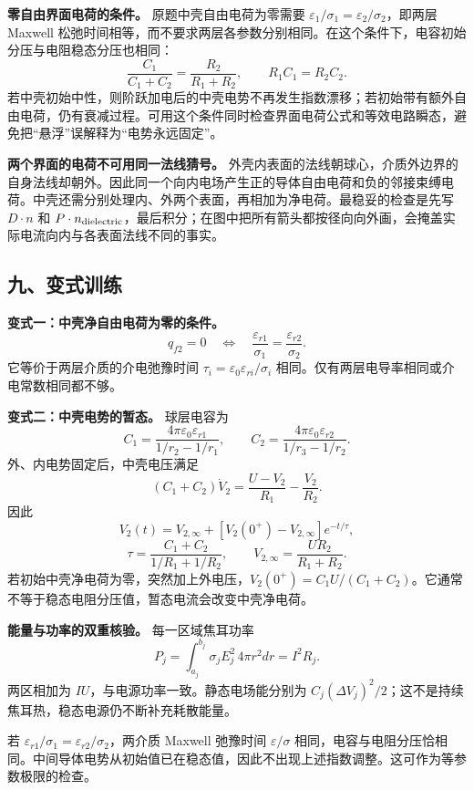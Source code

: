\documentclass[12pt,a4paper,UTF8]{ctexart}
\begin{document}
\textbf{零自由界面电荷的条件。} 原题中壳自由电荷为零需要
\(\varepsilon_1/\sigma_1=\varepsilon_2/\sigma_2\)，即两层 Maxwell
松弛时间相等，而不要求两层各参数分别相同。在这个条件下，电容初始分压与电阻稳态分压也相同：
\[
\frac{C_1}{C_1+C_2}
=\frac{R_2}{R_1+R_2},
\qquad R_1C_1=R_2C_2.
\]
若中壳初始中性，则阶跃加电后的中壳电势不再发生指数漂移；若初始带有额外自由电荷，仍有衰减过程。可用这个条件同时检查界面电荷公式和等效电路瞬态，避免把``悬浮''误解释为``电势永远固定''。

\textbf{两个界面的电荷不可用同一法线猜号。}
外壳内表面的法线朝球心，介质外边界的自身法线却朝外。因此同一个向内电场产生正的导体自由电荷和负的邻接束缚电荷。中壳还需分别处理内、外两个表面，再相加为净电荷。最稳妥的检查是先写
\(D\cdot n\) 和
\(P\cdot n_{\rm dielectric}\)，最后积分；在图中把所有箭头都按径向向外画，会掩盖实际电流向内与各表面法线不同的事实。

\subsection{九、变式训练}\label{ux4e5dux53d8ux5f0fux8badux7ec3-7}

\textbf{变式一：中壳净自由电荷为零的条件。} \[
q_{f2}=0
\quad\Longleftrightarrow\quad
\frac{\varepsilon_{r1}}{\sigma_1}
=\frac{\varepsilon_{r2}}{\sigma_2}.
\] 它等价于两层介质的介电弛豫时间
\(\tau_i=\varepsilon_0\varepsilon_{ri}/\sigma_i\)
相同。仅有两层电导率相同或介电常数相同都不够。

\textbf{变式二：中壳电势的暂态。} 球层电容为 \[
C_1=\frac{4\pi\varepsilon_0\varepsilon_{r1}}
{1/r_2-1/r_1},\qquad
C_2=\frac{4\pi\varepsilon_0\varepsilon_{r2}}
{1/r_3-1/r_2}.
\] 外、内电势固定后，中壳电压满足 \[
(C_1+C_2)\dot V_2
=\frac{U-V_2}{R_1}-\frac{V_2}{R_2}.
\] 因此 \[
V_2(t)=V_{2,\infty}
+[V_2(0^+)-V_{2,\infty}]e^{-t/\tau},
\] \[
\tau=\frac{C_1+C_2}{1/R_1+1/R_2},\qquad
V_{2,\infty}=\frac{UR_2}{R_1+R_2}.
\]
若初始中壳净电荷为零，突然加上外电压，\(V_2(0^+)=C_1U/(C_1+C_2)\)。它通常不等于稳态电阻分压值，暂态电流会改变中壳净电荷。

\textbf{能量与功率的双重核验。} 每一区域焦耳功率 \[
P_j=\int_{a_j}^{b_j}\sigma_j E_j^2\,4\pi r^2dr
=I^2R_j.
\] 两区相加为 \(IU\)，与电源功率一致。静态电场能分别为
\(C_j(\Delta V_j)^2/2\)；这不是持续焦耳热，稳态电源仍不断补充耗散能量。

若 \(\varepsilon_{r1}/\sigma_1=\varepsilon_{r2}/\sigma_2\)，两介质
Maxwell 弛豫时间 \(\varepsilon/\sigma\)
相同，电容与电阻分压恰相同。中间导体电势从初始值已在稳态值，因此不出现上述指数调整。这可作为等参数极限的检查。
\end{document}
